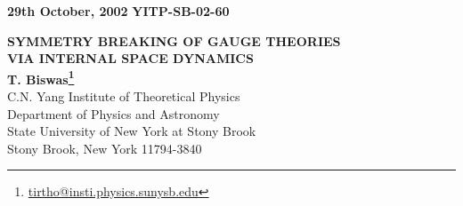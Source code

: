 \documentclass[a4paper,12pt]{article}
\def\mhref#1{\href{mailto:#1}{#1}}
\begin{document}
\providecommand{\p}{\partial}
\providecommand{\hp}{\hat{\p}}
\providecommand{\ov}{\overline}
\providecommand{\da}{^{\dagger}}
\providecommand{\w}{\wedge}
\providecommand{\al}{\alpha}
\providecommand{\bb}{\beta}
\providecommand{\ga}{\gamma}
\providecommand{\te}{\theta}
\providecommand{\de}{\delta}
\providecommand{\et}{\tilde{e}}
\providecommand{\ze}{\zeta}
\providecommand{\s}{\sigma}
\providecommand{\e}{\epsilon}
\providecommand{\om}{\omega}
\providecommand{\Om}{\Omega}
\providecommand{\la}{\lambda}
\providecommand{\La}{\Lambda}
\providecommand{\n}{\nabla}
\providecommand{\hn}{\hat{\nabla}}
\providecommand{\hph}{\hat{\phi}}
\providecommand{\ah}{\hat{a}}
\providecommand{\bh}{\hat{b}}
\providecommand{\ch}{\hat{c}}
\providecommand{\eh}{\hat{e}}
\providecommand{\ph}{\hat{p}}
\providecommand{\qh}{\hat{q}}
\providecommand{\mh}{\hat{m}}
\providecommand{\nh}{\hat{n}}
\providecommand{\as}{\breve{a}}
\providecommand{\bs}{\breve{b}}
\providecommand{\cs}{\breve{c}}
\providecommand{\ds}{\breve{d}}
\providecommand{\es}{\breve{e}}
\providecommand{\ms}{\breve{m}}
\providecommand{\ns}{\breve{n}}
\providecommand{\ps}{\breve{p}}
\providecommand{\ad}{\dot{a}}
\providecommand{\bd}{\dot{b}}
\providecommand{\gd}{\dot{c}}
\providecommand{\dd}{\dot{\delta}}
\providecommand{\ed}{\dot{\eta}}
\providecommand{\zd}{\dot{\zeta}}
\providecommand{\md}{\dot{m}}
\providecommand{\nd}{\dot{n}}
\providecommand{\az}{\grave{a}}
\providecommand{\bz}{\grave{b}}
\providecommand{\nz}{\grave{n}}
\providecommand{\mz}{\grave{m}}
\providecommand{\tb}{\overline{\theta}}
\providecommand{\ti}{\widetilde}

\providecommand{\2}{\textstyle{1\over 2}}
\providecommand{\3}{\frac{1}{3}}
\providecommand{\4}{\frac{1}{4}}
\providecommand{\8}{\frac{1}{8}}
\providecommand{\6}{\frac{1}{16}}
\providecommand{\ra}{\rightarrow}
\providecommand{\Ra}{\Rightarrow}
\providecommand{\im}{\Longleftrightarrow}
\providecommand{\hs}{\hspace{5mm}}
\providecommand{\x}{\star}
\providecommand{\Delt}{\p^{\star}}

\thispagestyle{empty}
{\bf 29th October, 2002} \hspace{\fill}
{\bf YITP-SB-02-60}

\vspace{1cm}
\begin{center}{\Large{\bf SYMMETRY BREAKING OF GAUGE THEORIES\\

\vspace{3mm}
 VIA INTERNAL SPACE DYNAMICS}}\\
\vspace{1cm}
{\large{\bf T. Biswas\footnote{\mhref{tirtho@insti.physics.sunysb.edu} }}}\\
\vspace{5mm}
{\small C.N. Yang Institute of Theoretical Physics\\
Department of Physics and Astronomy\\
State University of New York at Stony Brook\\
Stony Brook, New York 11794-3840}
\end{center}
\end{document}
